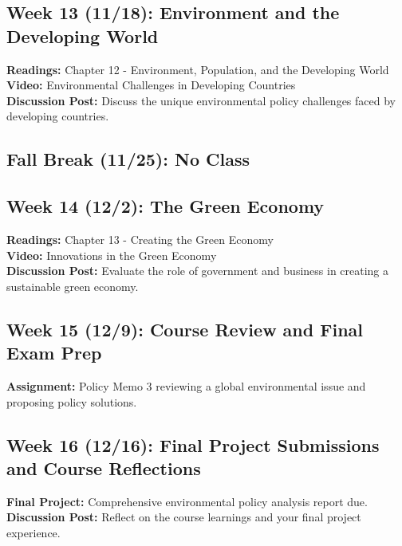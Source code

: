 \documentclass[12pt, letterpaper]{article}
\begin{document}
\subsection*{Week 13 (11/18): Environment and the Developing World}
\textbf{Readings:} Chapter 12 - Environment, Population, and the Developing World\\
\textbf{Video:} Environmental Challenges in Developing Countries\\
\textbf{Discussion Post:} Discuss the unique environmental policy challenges faced by developing countries.

\subsection*{Fall Break (11/25): No Class}

\subsection*{Week 14 (12/2): The Green Economy}
\textbf{Readings:} Chapter 13 - Creating the Green Economy\\
\textbf{Video:} Innovations in the Green Economy\\
\textbf{Discussion Post:} Evaluate the role of government and business in creating a sustainable green economy.

\subsection*{Week 15 (12/9): Course Review and Final Exam Prep}
\textbf{Assignment:} Policy Memo 3 reviewing a global environmental issue and proposing policy solutions.

\subsection*{Week 16 (12/16): Final Project Submissions and Course Reflections}
\textbf{Final Project:} Comprehensive environmental policy analysis report due.\\
\textbf{Discussion Post:} Reflect on the course learnings and your final project experience.
\end{document}
